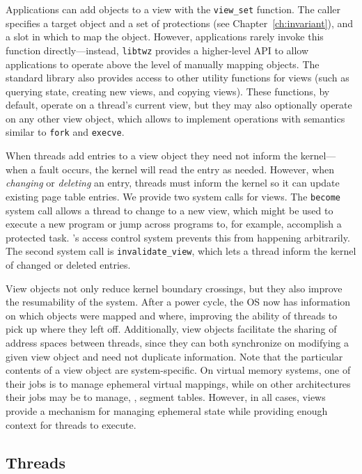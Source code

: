 Applications can add objects to a view with the \texttt{view\_set} function. The caller specifies a
target object and a set of protections (see Chapter~\ref{ch:invariant}), and a slot in which to
map the object. However, applications rarely invoke this function directly---instead,
\texttt{libtwz} provides a higher-level API to allow applications to operate above the level of
manually mapping objects. The standard library also provides access to other utility functions for
views (such as querying state, creating new views, and copying views). These functions, by default,
operate on a thread's current view, but they may also optionally operate on any other view object,
which allows \Twizzler to implement operations with semantics similar to \texttt{fork} and \texttt{execve}.

When threads add entries to a view object they need not inform the kernel---when
a fault occurs, the kernel will read the entry as needed. However, when \emph{changing} or
\emph{deleting} an entry, threads must inform the kernel so it can update existing page table entries.
We provide two system calls for views. The \texttt{become} system call allows a thread to
change to a new view, which might be used to execute a new program or jump across programs to, for
example, accomplish a protected task. \Twizzler's access control system prevents this from happening
arbitrarily. The second system call is \texttt{invalidate\_view}, which lets a thread inform the
kernel of changed or deleted entries.

View objects not only reduce kernel boundary crossings, but they also improve the resumability of
the system. After a power cycle, the OS now has information on which objects were mapped and where,
improving the ability of threads to pick up where they left off. Additionally, view objects
facilitate the sharing of address spaces between threads, since they can both synchronize on
modifying a given view object and need not duplicate information. Note that the particular contents
of a view object are system-specific. On virtual memory systems, one of their jobs is to manage
ephemeral virtual mappings, while on other architectures their jobs may be to manage, \eg, segment
tables. However, in all cases, views provide a mechanism for managing ephemeral state while
providing enough context for threads to execute.

\subsection{Threads}

